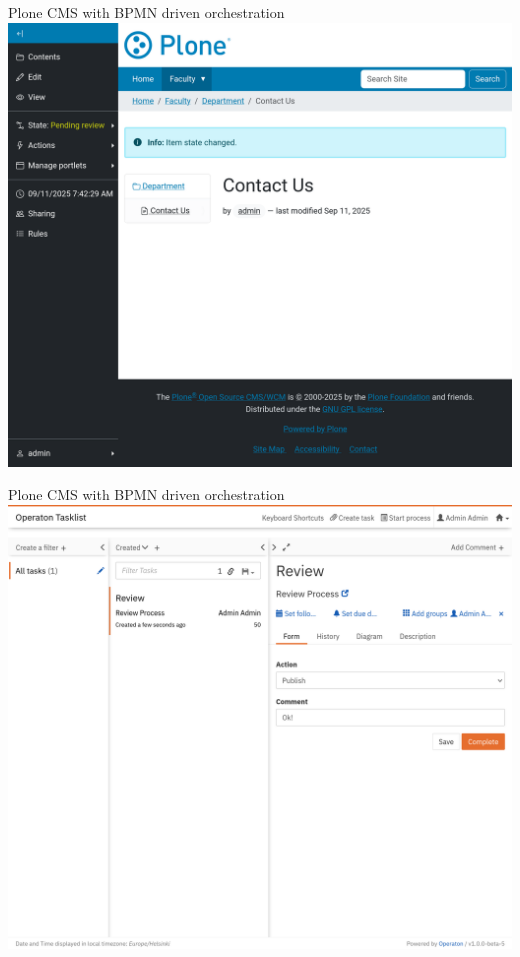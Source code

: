 \documentclass[12pt,aspectratio=169]{beamer}
\begin{document}

\begin{frame}{Plone CMS with BPMN driven orchestration}
  \includegraphics[width=0.95\columnwidth]{images/submit-02.png}
\end{frame}


\begin{frame}{Plone CMS with BPMN driven orchestration}
  \includegraphics[width=0.95\columnwidth]{images/tasklist.png}
\end{frame}
\end{document}
